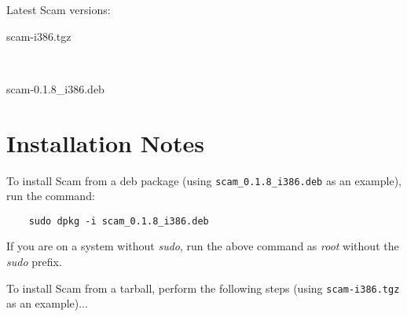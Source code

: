 \documentclass{article}
\begin{document}
Latest Scam versions:

\begin{description}
    \item
         {scam-i386.tgz}
    \item
    \item
    \item
        ~
    \item
         {scam-0.1.8\_i386.deb}
    \item
\end{description}

%
%


\section*{Installation Notes}

To install Scam from a deb package
(using {\tt scam\_0.1.8\_i386.deb} as an example), run the command:

\begin{verbatim}
    sudo dpkg -i scam_0.1.8_i386.deb
\end{verbatim}

If you are on a system without {\it sudo}, run the above command
as {\it root} without the {\it sudo} prefix.

To install Scam from a tarball, perform the following steps
(using {\tt scam-i386.tgz} as an example)...
\end{document}
